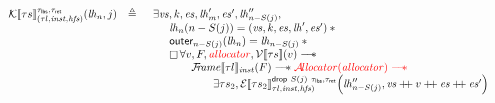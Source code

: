 \documentclass{standalone}
\begin{document}
\[
\begin{array}{rcl}
  \CONTvalid \llbracket \tau s \rrbracket_{(\tau l, \V{inst}, \V{hfs})}^{\tau_{\K{lbs}}, \tau_{\K{ret}}}(\V{lh}_n,j) & \triangleq &
  \begin{array}[t]{l}
    \exists \V{vs}, k, \V{es}, \V{lh}'_m, \V{es'}, \V{lh}''_{n - S(j)},
  \\
    \quad
    \begin{array}{l}
      \V{lh}_n(n - S(j)) = (\V{vs},k,\V{es},\V{lh}',\V{es}') \ast {}
    \\
      \K{outer}_{n - S(j)}(\V{lh}_n) = \V{lh}_{n - S(j)} \ast {}
    \\
    \always \forall v, F, \rr{\V{allocator}}, \Vvalid \llbracket \tau s \rrbracket(v) \wand
                                                                                                          \\
                                                                                                          \qquad{} \FRvalid \llbracket \tau l \rrbracket_{\V{inst}}(F) \wand \rr{\Avalid(\V{allocator}) \wand}
                                                                                                          \\
                                                                                                          \qquad\qquad{} \exists \tau s_2, \Evalid \llbracket \tau s_2 \rrbracket_{\tau l, \V{inst}, \V{hfs})}^{\K{drop}~S(j)~\tau_{\K{lbs}},\tau_{\K{ret}}}{ \left(\V{lh}''_{n - S(j)}, \V{vs}\mdoubleplus v \mdoubleplus \V{es} \mdoubleplus \V{es}' \right) }\\[1em]
      \end{array}
    \end{array}
  \end{array}
\]
\end{document}

